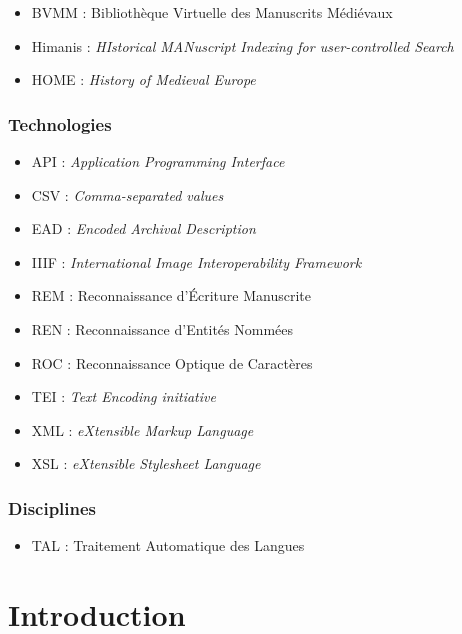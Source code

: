 \documentclass[a4paper,12pt,twoside]{book}
\begin{document}
	\begin{itemize}
		\item BVMM : Bibliothèque Virtuelle des Manuscrits Médiévaux
		\item Himanis : \textit{HIstorical MANuscript Indexing for user-controlled Search}
		\item HOME : \textit{History of Medieval Europe}
	\end{itemize}
	
	\subsection*{Technologies}
	
	\begin{itemize}
		\item API : \textit{Application Programming Interface}
		\item CSV : \textit{Comma-separated values}
		\item EAD : \textit{Encoded Archival Description}
		\item IIIF : \textit{International Image Interoperability Framework}
		\item REM : Reconnaissance d'Écriture Manuscrite
		\item REN : Reconnaissance d'Entités Nommées
		\item ROC : Reconnaissance Optique de Caractères
		\item TEI : \textit{Text Encoding initiative}
		\item XML : \textit{eXtensible Markup Language}
		\item XSL : \textit{eXtensible Stylesheet Language}
	\end{itemize}

	\subsection*{Disciplines}
	
	\begin{itemize}
		\item TAL : Traitement Automatique des Langues
	\end{itemize}
	
	\backmatter
	\printbibliography
	
	\chapter{Introduction}
	
\end{document}
